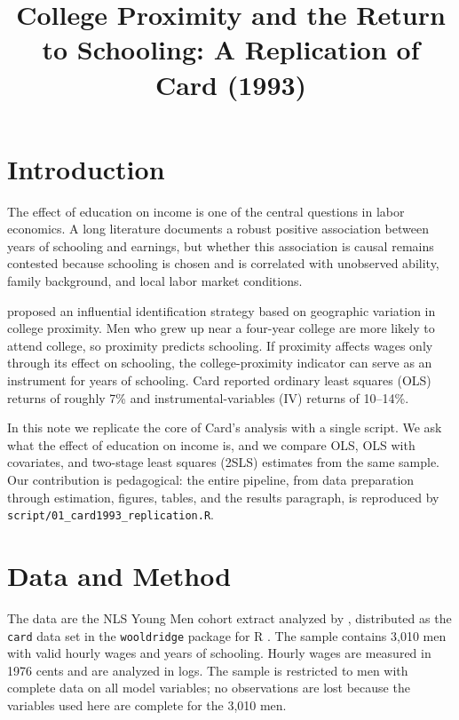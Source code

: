\documentclass[man,12pt,floatsintext]{apa7}
\title{College Proximity and the Return to Schooling: A Replication of Card (1993)}
\begin{document}
\maketitle

\section{Introduction}

The effect of education on income is one of the central questions in labor
economics. A long literature documents a robust positive association between
years of schooling and earnings, but whether this association is causal remains
contested because schooling is chosen and is correlated with unobserved ability,
family background, and local labor market conditions.

\Textcite{card1993} proposed an influential identification strategy based on
geographic variation in college proximity. Men who grew up near a four-year
college are more likely to attend college, so proximity predicts schooling.
If proximity affects wages only through its effect on schooling, the
college-proximity indicator can serve as an instrument for years of schooling.
Card reported ordinary least squares (OLS) returns of roughly 7\% and
instrumental-variables (IV) returns of 10--14\%.

In this note we replicate the core of Card's analysis with a single script. We
ask what the effect of education on income is, and we compare OLS, OLS with
covariates, and two-stage least squares (2SLS) estimates from the same sample.
Our contribution is pedagogical: the entire pipeline, from data preparation
through estimation, figures, tables, and the results paragraph, is reproduced
by \texttt{script/01\_card1993\_replication.R}.

\section{Data and Method}

The data are the NLS Young Men cohort extract analyzed by
\textcite{card1993}, distributed as the \texttt{card} data set in the
\texttt{wooldridge} package for R \parencite{wooldridge2010}. The sample
contains 3,010 men with valid hourly wages and years of schooling. Hourly wages
are measured in 1976 cents and are analyzed in logs. The sample is restricted
to men with complete data on all model variables; no observations are lost
because the variables used here are complete for the 3,010 men.
\end{document}
